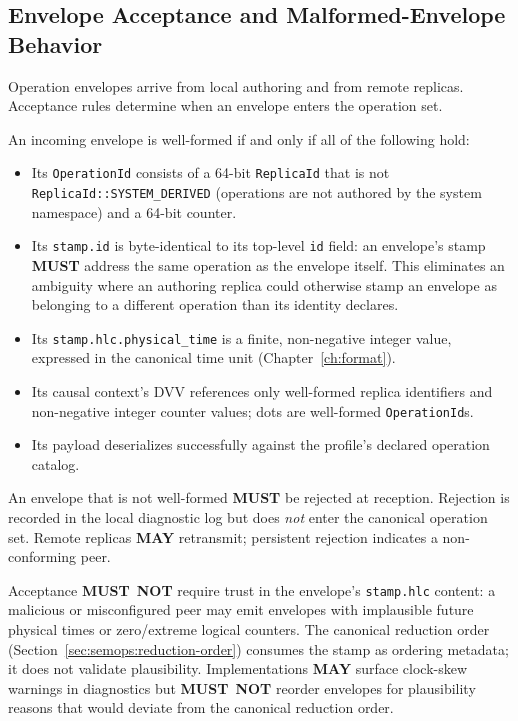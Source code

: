 \documentclass[11pt,letterpaper]{report}
\newcounter{requirement}[chapter]
\newcommand{\MUST}{\textbf{MUST}}
\newcommand{\MUSTNOT}{\textbf{MUST}\nobreak\ \textbf{NOT}}
\newcommand{\MAY}{\textbf{MAY}}
\begin{document}
\subsection{Envelope Acceptance and Malformed-Envelope Behavior}
\label{sec:semops:acceptance}

Operation envelopes arrive from local authoring and from remote
replicas. Acceptance rules determine when an envelope enters the
operation set.

\begin{requirement}
  \label{req:semops:envelope-well-formedness}
  An incoming envelope is well-formed if and only if all of the
  following hold:
  \begin{itemize}
    \item Its \texttt{OperationId} consists of a 64-bit
      \texttt{ReplicaId} that is not
      \texttt{ReplicaId::SYSTEM\_DERIVED} (operations are not
      authored by the system namespace) and a 64-bit counter.
    \item Its \texttt{stamp.id} is byte-identical to its
      top-level \texttt{id} field: an envelope's stamp \MUST{}
      address the same operation as the envelope itself. This
      eliminates an ambiguity where an authoring replica could
      otherwise stamp an envelope as belonging to a different
      operation than its identity declares.
    \item Its \texttt{stamp.hlc.physical\_time} is a finite,
      non-negative integer value, expressed in the canonical
      time unit (Chapter~\ref{ch:format}).
    \item Its causal context's DVV references only well-formed
      replica identifiers and non-negative integer counter
      values; dots are well-formed \texttt{OperationId}s.
    \item Its payload deserializes successfully against the
      profile's declared operation catalog.
  \end{itemize}

  An envelope that is not well-formed \MUST{} be rejected at
  reception. Rejection is recorded in the local diagnostic log
  but does \emph{not} enter the canonical operation set. Remote
  replicas \MAY{} retransmit; persistent rejection indicates a
  non-conforming peer.

  Acceptance \MUSTNOT{} require trust in the envelope's
  \texttt{stamp.hlc} content: a malicious or misconfigured peer
  may emit envelopes with implausible future physical times or
  zero/extreme logical counters. The canonical reduction order
  (Section~\ref{sec:semops:reduction-order}) consumes the stamp
  as ordering metadata; it does not validate plausibility.
  Implementations \MAY{} surface clock-skew warnings in
  diagnostics but \MUSTNOT{} reorder envelopes for plausibility
  reasons that would deviate from the canonical reduction order.
\end{requirement}
\end{document}

